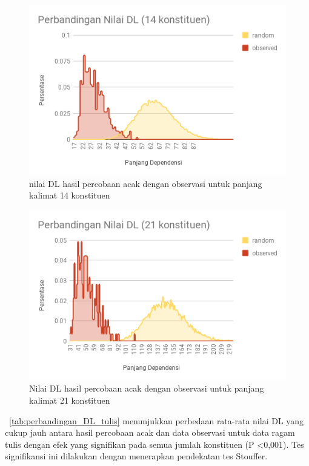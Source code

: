 \begin{figure}
	\centering \includegraphics[width=1
	\textwidth] {pics/t14randomobs.png} 
	\caption{ nilai DL hasil percobaan acak dengan observasi untuk panjang kalimat 14 konstituen}\label{fig:t14randomobs} 
\end{figure}

\begin{figure}
	\centering \includegraphics[width=1
	\textwidth] {pics/t21randomobs.png} 
	\caption{Nilai DL hasil percobaan acak dengan observasi untuk panjang kalimat 21 konstituen}\label{fig:t21randomobs} 
\end{figure}

\tab~\ref{tab:perbandingan_DL_tulis} menunjukkan perbedaan rata-rata nilai DL yang cukup jauh antara hasil percobaan acak dan data observasi untuk data ragam tulis dengan efek yang signifikan pada semua jumlah konstituen (P \textless 0,001). Tes signifikansi ini dilakukan dengan menerapkan pendekatan tes Stouffer.

